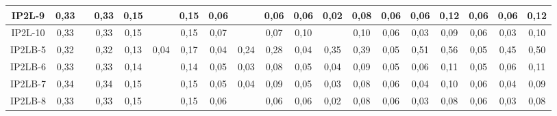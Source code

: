 \begin{table}[h]
{\begin{tabular}{c|c|c|c|c|c|c|c|c|c|c|c|c|c|c|c|c|c|c|}
\multicolumn{1}{|c|}{IP2L-9} & {\color[HTML]{656565} 0,33} & {\color[HTML]{656565} } & 0,33 & {\color[HTML]{656565} 0,15} & {\color[HTML]{656565} } & 0,15 & {\color[HTML]{656565} 0,06} & {\color[HTML]{656565} } & 0,06 & {\color[HTML]{656565} 0,06} & {\color[HTML]{656565} 0,02} & 0,08 & {\color[HTML]{656565} 0,06} & {\color[HTML]{656565} 0,06} & 0,12 & {\color[HTML]{656565} 0,06} & {\color[HTML]{656565} 0,06} & 0,12 \\ \hline
\multicolumn{1}{|c|}{IP2L-10} & {\color[HTML]{656565} 0,33} & {\color[HTML]{656565} } & 0,33 & {\color[HTML]{656565} 0,15} & {\color[HTML]{656565} } & 0,15 & {\color[HTML]{656565} 0,07} & {\color[HTML]{656565} } & 0,07 & {\color[HTML]{656565} 0,10} & {\color[HTML]{656565} } & 0,10 & {\color[HTML]{656565} 0,06} & {\color[HTML]{656565} 0,03} & 0,09 & {\color[HTML]{656565} 0,06} & {\color[HTML]{656565} 0,03} & 0,10 \\ \hline
\multicolumn{1}{|c|}{IP2LB-5} & {\color[HTML]{656565} 0,32} & {\color[HTML]{656565} } & 0,32 & {\color[HTML]{656565} 0,13} & {\color[HTML]{656565} 0,04} & 0,17 & {\color[HTML]{656565} 0,04} & {\color[HTML]{656565} 0,24} & 0,28 & {\color[HTML]{656565} 0,04} & {\color[HTML]{656565} 0,35} & 0,39 & {\color[HTML]{656565} 0,05} & {\color[HTML]{656565} 0,51} & 0,56 & {\color[HTML]{656565} 0,05} & {\color[HTML]{656565} 0,45} & 0,50 \\ \hline
\multicolumn{1}{|c|}{IP2LB-6} & {\color[HTML]{656565} 0,33} & {\color[HTML]{656565} } & 0,33 & {\color[HTML]{656565} 0,14} & {\color[HTML]{656565} } & 0,14 & {\color[HTML]{656565} 0,05} & {\color[HTML]{656565} 0,03} & 0,08 & {\color[HTML]{656565} 0,05} & {\color[HTML]{656565} 0,04} & 0,09 & {\color[HTML]{656565} 0,05} & {\color[HTML]{656565} 0,06} & 0,11 & {\color[HTML]{656565} 0,05} & {\color[HTML]{656565} 0,06} & 0,11 \\ \hline
\multicolumn{1}{|c|}{IP2LB-7} & {\color[HTML]{656565} 0,34} & {\color[HTML]{656565} } & 0,34 & {\color[HTML]{656565} 0,15} & {\color[HTML]{656565} } & 0,15 & {\color[HTML]{656565} 0,05} & {\color[HTML]{656565} 0,04} & 0,09 & {\color[HTML]{656565} 0,05} & {\color[HTML]{656565} 0,03} & 0,08 & {\color[HTML]{656565} 0,06} & {\color[HTML]{656565} 0,04} & 0,10 & {\color[HTML]{656565} 0,06} & {\color[HTML]{656565} 0,04} & 0,09 \\ \hline
\multicolumn{1}{|c|}{IP2LB-8} & {\color[HTML]{656565} 0,33} & {\color[HTML]{656565} } & 0,33 & {\color[HTML]{656565} 0,15} & {\color[HTML]{656565} } & 0,15 & {\color[HTML]{656565} 0,06} & {\color[HTML]{656565} } & 0,06 & {\color[HTML]{656565} 0,06} & {\color[HTML]{656565} 0,02} & 0,08 & {\color[HTML]{656565} 0,06} & {\color[HTML]{656565} 0,03} & 0,08 & {\color[HTML]{656565} 0,06} & {\color[HTML]{656565} 0,03} & 0,08 \\ \hline

\end{tabular}}
\end{table}
